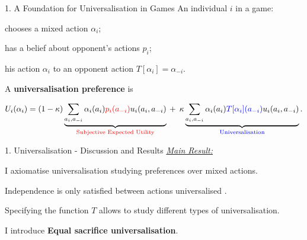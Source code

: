 \documentclass[usenames,dvipsnames,aspectratio=169,11pt,handout]{beamer}
\begin{document}
\begin{frame}[noframenumbering]{1. A Foundation for Universalisation in Games}
	An individual \( i \) in a game:

	\vfill

	\begin{wideitemize}
		\item chooses a mixed action \( \alpha_i \);
		\item has a belief about opponent's actions \( p_i \);
		\item {} his action \( \alpha_i \) to an opponent action \( T [\alpha_{i} ] = \alpha_{-i} \).
	\end{wideitemize}

	\vfill

	A \textbf{universalisation preference} is

	\vfill

	\[
		\begin{aligned}
			U_i(\alpha_i) = (1-\kappa) \underbrace{\sum_{a_i, a_{-i}} \alpha_i(a_i) \textcolor{red}{p_{i}(a_{-i})} u_i(a_i, a_{-i})}_{\text{\textcolor{red}{Subjective Expected Utility}}} \: + \: \: \kappa \underbrace{\sum_{a_i, a_{-i}} \alpha_i(a_i) \textcolor{blue}{T [ \alpha_i ](a_{-i})} u_i(a_i, a_{-i})}_{\text{\textcolor{blue}{Universalisation}}} .
		\end{aligned}
	\]

\end{frame}

\begin{frame}{1. Universalisation - Discussion and Results}
	\underline{\textit{Main Result:}}

	I axiomatise universalisation studying preferences over mixed actions.

	\vfill

	Independence is only satisfied between actions universalised .

	\vfill

	Specifying the function \( T \) allows to study different types of universalisation.

	\vfill

	I introduce \textbf{Equal sacrifice universalisation}.

\end{frame}
\end{document}
